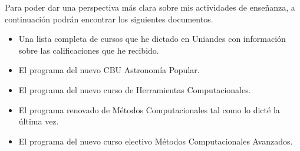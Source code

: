 \documentclass[letterpaper,12pt,onecolumn]{article}
\begin{document}
Para poder dar una perspectiva m\'as clara sobre mis actividades de
ense\~nanza, a continuaci\'on podr\'an encontrar los siguientes documentos.
\begin{itemize}
\item Una lista completa de cursos que he dictado en Uniandes con
  informaci\'on sobre las calificaciones que he recibido. 
\item El programa del nuevo CBU Astronom\'ia Popular.
\item El programa del nuevo curso de Herramientas Computacionales.
\item El programa renovado de M\'etodos Computacionales tal como lo
  dict\'e la \'ultima vez.
\item El programa del nuevo curso electivo M\'etodos Computacionales
  Avanzados. 
\end{itemize}
\end{document}
